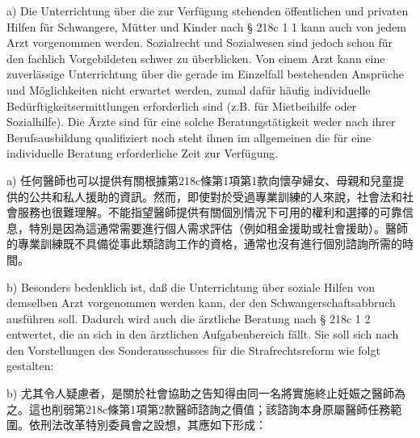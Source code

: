 \documentclass[12pt]{article}
\begin{document}
\syncleft
\begin{sourcepara}
a) Die Unterrichtung über die zur Verfügung stehenden öffentlichen und privaten Hilfen für Schwangere, Mütter und Kinder nach § 218c \abbrAbs{} 1 \abbrNr{} 1 kann auch von jedem Arzt vorgenommen werden. Sozialrecht und Sozialwesen sind jedoch schon für den fachlich Vorgebildeten schwer zu überblicken. Von einem Arzt kann eine zuverlässige Unterrichtung über die gerade im Einzelfall bestehenden Ansprüche und Möglichkeiten nicht erwartet werden, zumal dafür häufig individuelle Bedürftigkeitsermittlungen erforderlich sind (z.B. für Mietbeihilfe oder Sozialhilfe). Die Ärzte sind für eine solche Beratungstätigkeit weder nach ihrer Berufsausbildung qualifiziert noch steht ihnen im allgemeinen die für eine individuelle Beratung erforderliche Zeit zur Verfügung.
\end{sourcepara}
\begin{transpara}
a) 任何醫師也可以提供有關根據第218c條第1項第1款向懷孕婦女、母親和兒童提供的公共和私人援助的資訊。然而，即使對於受過專業訓練的人來說，社會法和社會服務也很難理解。不能指望醫師提供有關個別情況下可用的權利和選擇的可靠信息，特別是因為這通常需要進行個人需求評估（例如租金援助或社會援助）。醫師的專業訓練既不具備從事此類諮詢工作的資格，通常也沒有進行個別諮詢所需的時間。
\end{transpara}

\syncleft
\begin{sourcepara}
b) Besonders bedenklich ist, daß die Unterrichtung über soziale Hilfen von demselben Arzt vorgenommen werden kann, der den Schwangerschaftsabbruch ausführen soll. Dadurch wird auch die ärztliche Beratung nach § 218c \abbrAbs{} 1 \abbrNr{} 2 entwertet, die an sich in den ärztlichen Aufgabenbereich fällt. Sie soll sich nach den Vorstellungen des Sonderausschusses für die Strafrechtsreform wie folgt gestalten:
\end{sourcepara}
\begin{transpara}
b) 尤其令人疑慮者，是關於社會協助之告知得由同一名將實施終止妊娠之醫師為之。這也削弱第218c條第1項第2款醫師諮詢之價值；該諮詢本身原屬醫師任務範圍。依刑法改革特別委員會之設想，其應如下形成：
\end{transpara}
\end{document}
